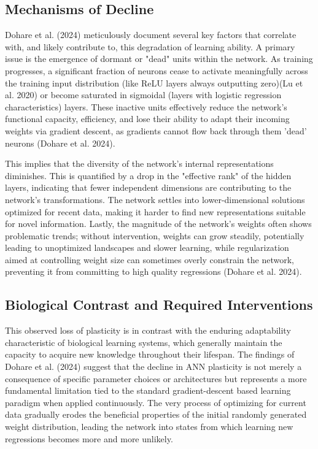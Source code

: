 \documentclass[
10pt, %
a4paper, %
oneside, %
headinclude,footinclude, %
BCOR5mm, %
]{scrartcl}
\begin{document}
\subsection{Mechanisms of Decline}

Dohare et al. (2024) meticulously document several key factors that correlate with, and likely contribute to, this degradation of learning ability. A primary issue is the emergence of dormant or "dead" units within the network. As training progresses, a significant fraction of neurons cease to activate meaningfully across the training input distribution (like ReLU layers always outputting zero)(Lu et al. 2020) or become saturated in sigmoidal (layers with logistic regression characteristics) layers. These inactive units effectively reduce the network's functional capacity, efficiency, and lose their ability to adapt their incoming weights via gradient descent, as gradients cannot flow back through them 'dead' neurons (Dohare et al. 2024). 

This implies that the diversity of the network's internal representations diminishes. {This is quantified by a drop in the "effective rank" of the hidden layers, indicating that fewer independent dimensions are contributing to the network's transformations. The network settles into lower-dimensional solutions optimized for recent data, making it harder to find new representations suitable for novel information. }Lastly, the magnitude of the network's weights often shows problematic trends; without intervention, weights can grow steadily, potentially leading to unoptimized landscapes and slower learning, while regularization aimed at controlling weight size can sometimes overly constrain the network, preventing it from committing to high quality regressions (Dohare et al. 2024).

\subsection{Biological Contrast and Required Interventions}

This observed loss of plasticity is in contrast with the enduring adaptability characteristic of biological learning systems, which generally maintain the capacity to acquire new knowledge throughout their lifespan. The findings of Dohare et al. (2024) suggest that the decline in ANN plasticity is not merely a consequence of specific parameter choices or architectures but represents a more fundamental limitation tied to the standard gradient-descent based learning paradigm when applied continuously. {The very process of optimizing for current data gradually erodes the beneficial properties of the initial randomly generated weight distribution, leading the network into states from which learning new regressions becomes more and more unlikely.} 
\end{document}
